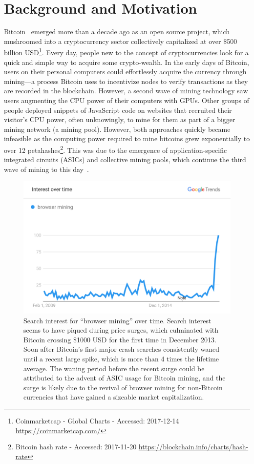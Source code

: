 \section{Background and Motivation}

Bitcoin~\cite{nakamoto2008bitcoin} emerged more than a decade ago as an open source project, which mushroomed into a cryptocurrency sector collectively capitalized at over \$500 billion USD\footnote{Coinmarketcap - Global Charts - Accessed: 2017-12-14 \url{https://coinmarketcap.com/}}. Every day, people new to the concept of cryptocurrencies look for a quick and simple way to acquire some crypto-wealth. In the early days of Bitcoin, users on their personal computers could effortlessly acquire the currency through mining---a process Bitcoin uses to incentivize nodes to verify transactions as they are recorded in the blockchain. However, a second wave of mining technology saw users augmenting the CPU power of their computers with GPUs. Other groups of people deployed snippets of JavaScript code on websites that recruited their visitor's CPU power, often unknowingly, to mine for them as part of a bigger mining network (\ie a mining pool). However, both approaches quickly became infeasible as the computing power required to mine bitcoins grew exponentially to over 12 petahashes\footnote{Bitcoin hash rate - Accessed: 2017-11-20 \url{https://blockchain.info/charts/hash-rate}}. This was due to the emergence of application-specific integrated circuits (ASICs) and collective mining pools, which continue the third wave of mining to this day~\cite{narayanan2016}. 

\begin{figure}[t]
\centering
\includegraphics[width=0.9\linewidth]{figures/browser_mining.png}
\caption[Browser Mining Search Interest]{Search interest for ``browser mining'' over time. Search interest seems to have piqued during price surges, which culminated with Bitcoin crossing \$1000 USD for the first time in December 2013. Soon after Bitcoin's first major crash searches consistently waned until a recent large spike, which is more than 4 times the lifetime average. The waning period before the recent surge could be attributed to the advent of ASIC usage for Bitcoin mining, and the surge is likely due to the revival of browser mining for non-Bitcoin currencies that have gained a sizeable market capitalization.\label{fig:interest}}
\end{figure}

